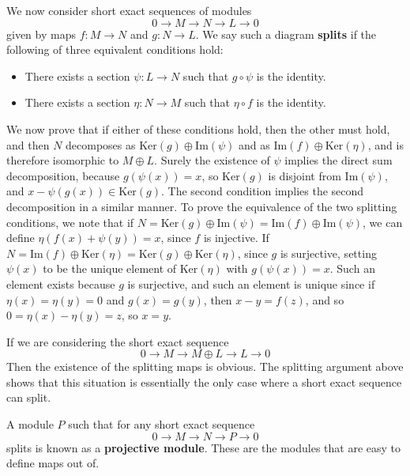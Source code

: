 We now consider short exact sequences of modules
%
\[ 0 \to M \to N \to L \to 0 \]
%
given by maps $f: M \to N$ and $g: N \to L$. We say such a diagram {\bf splits} if the following of three equivalent conditions hold:
%
\begin{itemize}
    \item There exists a section $\psi: L \to N$ such that $g \circ \psi$ is the identity.

    \item There exists a section $\eta: N \to M$ such that $\eta \circ f$ is the identity.
\end{itemize}
%
We now prove that if either of these conditions hold, then the other must hold, and then $N$ decomposes as $\text{Ker}(g) \oplus \text{Im}(\psi)$ and as $\text{Im}(f) \oplus \text{Ker}(\eta)$, and is therefore isomorphic to $M \oplus L$. Surely the existence of $\psi$ implies the direct sum decomposition, because $g(\psi(x)) = x$, so $\text{Ker}(g)$ is disjoint from $\text{Im}(\psi)$, and $x - \psi(g(x)) \in \text{Ker}(g)$. The second condition implies the second decomposition in a similar manner. To prove the equivalence of the two splitting conditions, we note that if $N = \text{Ker}(g) \oplus \text{Im}(\psi) = \text{Im}(f) \oplus \text{Im}(\psi)$, we can define $\eta(f(x) + \psi(y)) = x$, since $f$ is injective. If $N = \text{Im}(f) \oplus \text{Ker}(\eta) = \text{Ker}(g) \oplus \text{Ker}(\eta)$, since $g$ is surjective, setting $\psi(x)$ to be the unique element of $\text{Ker}(\eta)$ with $g(\psi(x)) = x$. Such an element exists because $g$ is surjective, and such an element is unique since if $\eta(x) = \eta(y) = 0$ and $g(x) = g(y)$, then $x - y = f(z)$, and so $0 = \eta(x) - \eta(y) = z$, so $x = y$.

\begin{remark}
    If we are considering the short exact sequence
    \[ 0 \to M \to M \oplus L \to L \to 0 \]
    Then the existence of the splitting maps is obvious. The splitting argument above shows that this situation is essentially the only case where a short exact sequence can split.
\end{remark}

A module $P$ such that for any short exact sequence
%
\[ 0 \to M \to N \to P \to 0 \]
%
splits is known as a {\bf projective module}. These are the modules that are easy to define maps out of.

